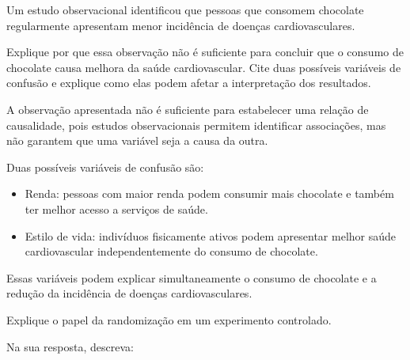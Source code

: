 \documentclass[a4paper,12pt,addpoints]{exam}
\begin{document}
	
	\begin{questions}
		
		\question[1]
		Um estudo observacional identificou que pessoas que consomem chocolate regularmente apresentam menor incidência de doenças cardiovasculares.
		
		Explique por que essa observação não é suficiente para concluir que o consumo de chocolate causa melhora da saúde cardiovascular. Cite duas possíveis variáveis de confusão e explique como elas podem afetar a interpretação dos resultados.
		
		\begin{solution}
			A observação apresentada não é suficiente para estabelecer uma relação de causalidade, pois estudos observacionais permitem identificar associações, mas não garantem que uma variável seja a causa da outra.
			
			Duas possíveis variáveis de confusão são:
			
			\begin{itemize}
				\item Renda: pessoas com maior renda podem consumir mais chocolate e também ter melhor acesso a serviços de saúde.
				\item Estilo de vida: indivíduos fisicamente ativos podem apresentar melhor saúde cardiovascular independentemente do consumo de chocolate.
			\end{itemize}
			
			Essas variáveis podem explicar simultaneamente o consumo de chocolate e a redução da incidência de doenças cardiovasculares.
		\end{solution}
		
		\question[1]
		
		Explique o papel da randomização em um experimento controlado.
		
		Na sua resposta, descreva:
		
		

\end{questions}
\end{document}
